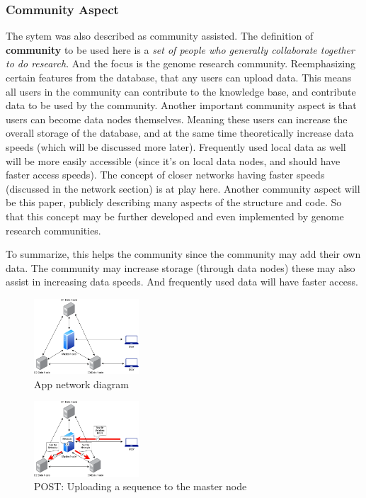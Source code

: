 \documentclass[acmsmall]{acmart}
\begin{document}
\subsubsection{Community Aspect} \label{community}
The sytem was also described as community assisted. The definition of \textbf{community} to be used here is a \textit{set of people who generally collaborate together to do research}. And the focus is the genome research community. Reemphasizing certain features from the database, that any users can upload data. This means all users in the community can contribute to the knowledge base, and contribute data to be used by the community. Another important community aspect is that users can become data nodes themselves. Meaning these users can increase the overall storage of the database, and at the same time theoretically increase data speeds (which will be discussed more later). Frequently used local data as well will be more easily accessible (since it's on local data nodes, and should have faster access speeds). The concept of closer networks having faster speeds (discussed in the network section) is at play here. Another community aspect will be this paper, publicly describing many aspects of the structure and code. So that this concept may be further developed and even implemented by genome research communities.

To summarize, this helps the community since the community may add their own data. The community may increase storage (through data nodes) these may also assist in increasing data speeds. And frequently used data will have faster access. 



\begin{figure}[h]
\caption{App network diagram}
\centering
\includegraphics[width=0.35\textwidth]{images/thesis1.png} 
\end{figure}

\begin{figure}[h]
\caption{POST: Uploading a sequence to the master node}
\centering
\includegraphics[width=0.35\textwidth]{images/thesis3.png} 
\end{figure}
\end{document}

